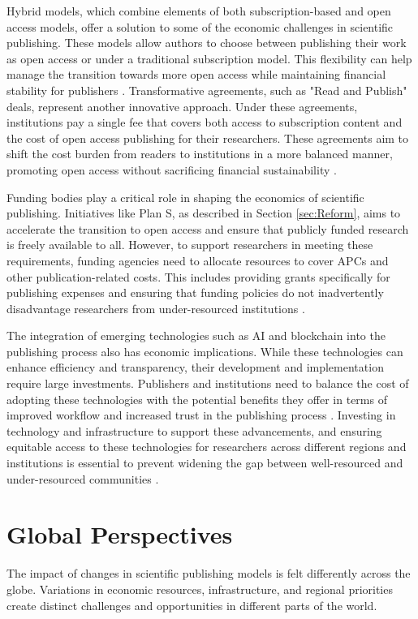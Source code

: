 \documentclass{article}
\begin{document}
Hybrid models, which combine elements of both subscription-based and open access models, offer a solution to some of the economic challenges in scientific publishing. These models allow authors to choose between publishing their work as open access or under a traditional subscription model. This flexibility can help manage the transition towards more open access while maintaining financial stability for publishers \cite{bjork2017scholarly}. Transformative agreements, such as "Read and Publish" deals, represent another innovative approach. Under these agreements, institutions pay a single fee that covers both access to subscription content and the cost of open access publishing for their researchers. These agreements aim to shift the cost burden from readers to institutions in a more balanced manner, promoting open access without sacrificing financial sustainability \cite{hinchliffe2019transformative}.

Funding bodies play a critical role in shaping the economics of scientific publishing. Initiatives like Plan S, as described in Section \ref{sec:Reform}, aims to accelerate the transition to open access and ensure that publicly funded research is freely available to all. However, to support researchers in meeting these requirements, funding agencies need to allocate resources to cover APCs and other publication-related costs. This includes providing grants specifically for publishing expenses and ensuring that funding policies do not inadvertently disadvantage researchers from under-resourced institutions \cite{leins2020gpt3}.

The integration of emerging technologies such as AI and blockchain into the publishing process also has economic implications. While these technologies can enhance efficiency and transparency, their development and implementation require large investments. Publishers and institutions need to balance the cost of adopting these technologies with the potential benefits they offer in terms of improved workflow and increased trust in the publishing process \cite{heaven2018ai}. Investing in technology and infrastructure to support these advancements, and ensuring equitable access to these technologies for researchers across different regions and institutions is essential to prevent widening the gap between well-resourced and under-resourced communities \cite{bender2021dangers}.


\section{Global Perspectives}
The impact of changes in scientific publishing models is felt differently across the globe. Variations in economic resources, infrastructure, and regional priorities create distinct challenges and opportunities in different parts of the world. 
\end{document}
